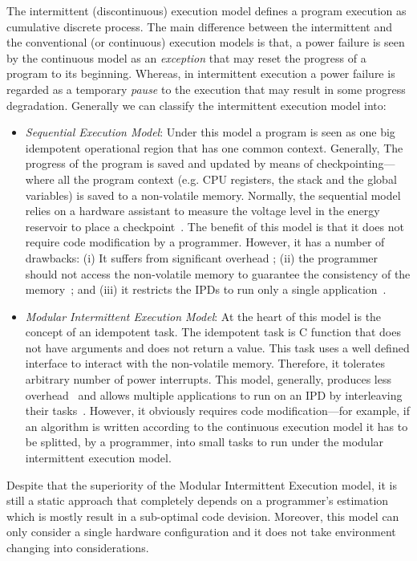 \documentclass[sigconf,anonymous,review]{acmart}
\begin{document}
	The intermittent (discontinuous) execution model defines a program execution as cumulative discrete process. The main difference between the intermittent and the conventional (or continuous) execution models is that, a power failure is seen by the continuous model as an \emph{exception} that may reset the progress of a program to its beginning. Whereas, in intermittent execution a power failure is regarded as a temporary \emph{pause} to the execution that may result in some progress degradation. Generally we can classify the intermittent execution model into: 
	\begin{itemize}
		\item \emph{Sequential Execution Model}:
			Under this model a program is seen as one big idempotent operational region that has one common context. Generally, The progress of the program is saved and updated by means of checkpointing---where all the program context (e.g. CPU registers, the stack and the global variables) is saved to a non-volatile memory. Normally, the sequential model relies on a hardware assistant to measure the voltage level in the energy reservoir to place a checkpoint~\cite{mementos, harvOS, hibernus}. The benefit of this model is that it does not require code modification by a programmer. However, it has a number of drawbacks: (i) It suffers from significant overhead \cite{chain}; (ii) the programmer should not access the non-volatile memory to guarantee the consistency of the memory~\cite{xxxx}; and (iii) it restricts the IPDs to run only a single application~\cite{inos}. 
		\item \emph{Modular Intermittent Execution Model}:
			At the heart of this model is the concept of an idempotent task. The idempotent task is C function that does not have arguments and does not return a value. This task uses a well defined interface to interact with the non-volatile memory. Therefore, it tolerates arbitrary number of power interrupts. This model, generally, produces less overhead~\cite{chain} and allows multiple applications to run on an IPD by interleaving their tasks~\cite{inos}. However, it obviously requires code modification---for example, if an algorithm is written according to the continuous execution model it has to be splitted, by a programmer, into small tasks to run under the modular intermittent execution model.
	\end{itemize}

Despite that the superiority of the Modular Intermittent Execution model, it is still a static approach that completely depends on a programmer's estimation which is mostly result in a sub-optimal code devision. Moreover, this model can only consider a single hardware configuration and it does not take environment changing into considerations. 
\end{document}
